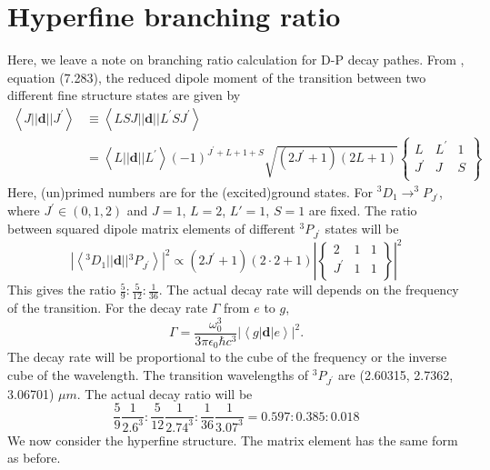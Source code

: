 \documentclass{article}
\begin{document}
\section{Hyperfine branching ratio}
Here, we leave a note on branching ratio calculation for D-P decay pathes. From  \cite{steckQuantumAtomOptics2022}, equation (7.283), the reduced dipole moment of the transition between two different fine structure states are given by
$$\begin{aligned}
\left< J||\mathbf{d}|| J^{\prime}\right> & \equiv \left< L S J||\mathbf{d}|| L^{\prime} S J^{\prime} \right> \\
& = \left< L||\mathbf{d}|| L^{\prime} \right> (-1)^{J^{\prime}+L+1+S} \sqrt{\left( 2 J^{\prime}+1 \right) (2 L+1)} \left\lbrace \begin{array}{ccc}
L & L^{\prime} & 1 \\
J^{\prime} & J & S \\
\end{array} \right\rbrace
\end{aligned}$$
Here, (un)primed numbers are for the (excited)ground states. For $^{3} {D}_{1} \rightarrow ^{3} P_{ J^{\prime} }$, where $J^{\prime} \in (0, 1, 2)$ and $J = 1$, $L=2$, $L'=1$, $S=1$ are fixed. The ratio between squared dipole matrix elements of different ${}^3{P}_{J^{\prime}}$ states will be
$$
\left| \left< {}^{3}{D}_{1} || \mathbf{d} || {}^3{P}_{J^{\prime}} \right> \right|^2 \propto (2J^{\prime}+1)(2\cdot 2+1)\left| \left\lbrace\begin{array}{ccc}
2 & 1 & 1 \\
J^{\prime} & 1 & 1 \\
\end{array}\right\rbrace  \right|^2
$$
This gives the ratio $\frac{5}{9}:\frac{5}{12}:\frac{1}{36}$. The actual decay rate will depends on the frequency of the transition. For the decay rate $\Gamma$ from $e$ to $g$,
$$
\Gamma = \frac{\omega_0^3}{3\pi \epsilon_0 \hbar c^3}| \left< g|\mathbf{d}|e \right>|^2.
$$
The decay rate will be proportional to the cube of the frequency or the inverse cube of the wavelength. The transition wavelengths of ${}^3{P}_{J^{\prime}}$ are (2.60315, 2.7362, 3.06701) $\mu m$. The actual decay ratio will be
$$
\frac{5}{9}\frac{1}{2.6^3}:\frac{5}{12}\frac{1}{2.74^3}:\frac{1}{36}\frac{1}{3.07^3} = 0.597:0.385:0.018
$$
We now consider the hyperfine structure. The matrix element has the same form as before.
\end{document}
